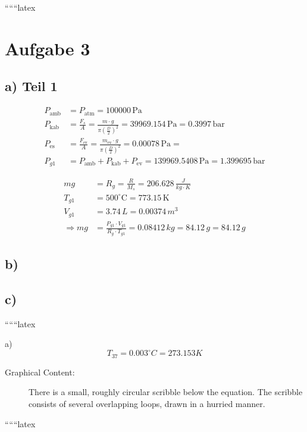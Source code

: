 
``````latex


\section*{Aufgabe 3}

\subsection*{a) Teil 1}

\begin{align*}
P_{\text{amb}} &= P_{\text{atm}} = 100000 \, \text{Pa} \\
P_{\text{kab}} &= \frac{F_s}{A} = \frac{m \cdot g}{\pi \left( \frac{D}{2} \right)^2} = 39969.154 \, \text{Pa} = 0.3997 \, \text{bar} \\
P_{\text{es}} &= \frac{F_{\text{ev}}}{A} = \frac{m_{\text{ev}} \cdot g}{\pi \left( \frac{D}{2} \right)^2} = 0.00078 \, \text{Pa} =  \\
P_{g1} &= P_{\text{amb}} + P_{\text{kab}} + P_{\text{ev}} = 139969.5408 \, \text{Pa} = 1.399695 \, \text{bar}
\end{align*}

\begin{align*}
mg &= R_g = \frac{R}{M_s} = 206.628 \, \frac{J}{kg \cdot K} \\
T_{g1} &= 500^\circ \text{C} = 773.15 \, \text{K} \\
V_{g1} &= 3.74 \, L = 0.00374 \, m^3 \\
\Rightarrow mg &= \frac{P_{g1} \cdot V_{g1}}{R_g \cdot T_{g1}} = 0.08412 \, kg = 84.12 \, g = 84.12 \, g
\end{align*}

\subsection*{b)}

\subsection*{c)}

``````latex


a) \[ T_{37} = 0.003^\circ C = 273.153 K \]

\begin{description}
    \item[Graphical Content:] There is a small, roughly circular scribble below the equation. The scribble consists of several overlapping loops, drawn in a hurried manner.
\end{description}

``````latex


